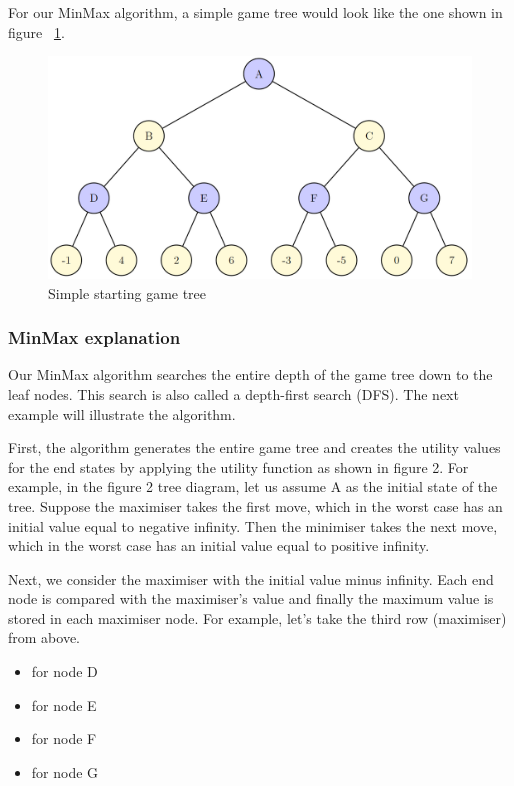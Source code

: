\documentclass[conference,pdf,table,xcdraw, utf8]{IEEEtran}
\begin{document}
For our MinMax algorithm, a simple game tree would look like the one shown in figure ~\ref{figure:tree_step1.PNG}.~\cite{MinMaxConnect4}

\begin{figure}[H]
    \centering
    \includegraphics[scale=0.39]{images/tree_step1.PNG}
    \caption{Simple starting game tree}
    \label{figure:tree_step1.PNG}
\end{figure}

\subsubsection{MinMax explanation}
Our MinMax algorithm searches the entire depth of the game tree down to the leaf nodes. This search is also called a depth-first search (DFS). The next example will illustrate the algorithm.~\cite{MinMaxConnect4_2}

First, the algorithm generates the entire game tree and creates the utility values for the end states by applying the utility function as shown in figure 2. For example, in the figure 2 tree diagram, let us assume A as the initial state of the tree. Suppose the maximiser takes the first move, which in the worst case has an initial value equal to negative infinity. Then the minimiser takes the next move, which in the worst case has an initial value equal to positive infinity.

Next, we consider the maximiser with the initial value minus infinity. Each end node is compared with the maximiser's value and finally the maximum value is stored in each maximiser node. For example, let's take the third row (maximiser) from above.

\begin{itemize}
    \item for node D 
    \item for node E 
    \item for node F 
    \item for node G 
\end{itemize}
\end{document}
